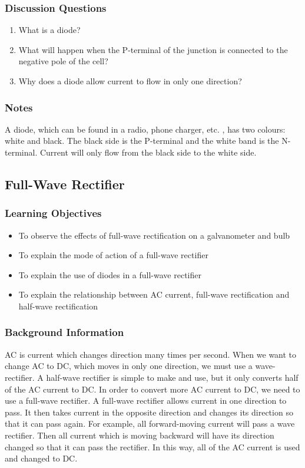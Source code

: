 \subsubsection*{Discussion Questions}
\begin{enumerate}
\item{What is a diode?}
\item{What will happen when the P-terminal of the junction is connected to the negative pole of the cell?}
\item{Why does a diode allow current to flow in only one direction?}
\end{enumerate}

\subsubsection*{Notes}
A diode, which can be found in a radio, phone charger, etc.  , has two colours: white and black. The black side is the P-terminal and the white band is the N-terminal. Current will only flow from the black side to the white side.  

	
\subsection{Full-Wave Rectifier}

\subsubsection*{Learning Objectives}
\begin{itemize}
\item{To observe the effects of full-wave rectification on a galvanometer and bulb}
\item{To explain the mode of action of a full-wave rectifier}
\item{To explain the use of diodes in a full-wave rectifier}
\item{To explain the relationship between AC current, full-wave rectification and half-wave rectification}
\end{itemize}

\subsubsection*{Background Information}
AC is current which changes direction many times per second.  When we want to change AC to DC, which moves in only one direction, we must use a wave-rectifier.  A half-wave rectifier is simple to make and use, but it only converts half of the AC current to DC.  In order to convert more AC current to DC, we need to use a full-wave rectifier.
A full-wave rectifier allows current in one direction to pass.  It then takes current in the opposite direction and changes its direction so that it can pass again.  For example, all forward-moving current will pass a wave rectifier.  Then all current which is moving backward will have its direction changed so that it can pass the rectifier.  In this way, all of the AC current is used and changed to DC.

